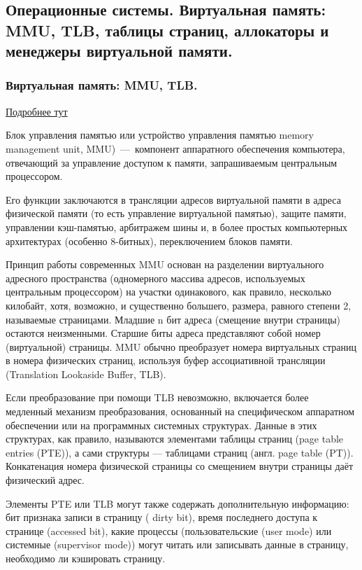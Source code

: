 \documentclass{article}
\begin{document}
\subsection{Операционные системы. Виртуальная память: MMU, TLB, таблицы страниц, аллокаторы и менеджеры виртуальной памяти.}

\subsubsection{Виртуальная память: MMU, TLB.}

\href{https://habr.com/ru/post/211150/}{Подробнее тут}

Блок управления памятью или устройство управления памятью memory management unit, MMU)~---~компонент аппаратного обеспечения компьютера, отвечающий за управление доступом к памяти, запрашиваемым центральным процессором.

Его функции заключаются в трансляции адресов виртуальной памяти в адреса физической памяти (то есть управление виртуальной памятью), защите памяти, управлении кэш-памятью, арбитражем шины и, в более простых компьютерных архитектурах (особенно 8-битных), переключением блоков памяти. 

Принцип работы современных MMU основан на разделении виртуального адресного пространства (одномерного массива адресов, используемых центральным процессором) на участки одинакового, как правило, несколько килобайт, хотя, возможно, и существенно большего, размера, равного степени 2, называемые страницами. Младшие n бит адреса (смещение внутри страницы) остаются неизменными. Старшие биты адреса представляют собой номер (виртуальной) страницы. MMU обычно преобразует номера виртуальных страниц в номера физических страниц, используя буфер ассоциативной трансляции (Translation Lookaside Buffer, TLB).

Если преобразование при помощи TLB невозможно, включается более медленный механизм преобразования, основанный на специфическом аппаратном обеспечении или на программных системных структурах. Данные в этих структурах, как правило, называются элементами таблицы страниц (page table entries (PTE)), а сами структуры — таблицами страниц (англ. page table (PT)). Конкатенация номера физической страницы со смещением внутри страницы даёт физический адрес.

Элементы PTE или TLB могут также содержать дополнительную информацию: бит признака записи в страницу ( dirty bit), время последнего доступа к странице (accessed bit), какие процессы (пользовательские (user mode) или системные (supervisor mode)) могут читать или записывать данные в страницу, необходимо ли кэшировать страницу.
\end{document}
